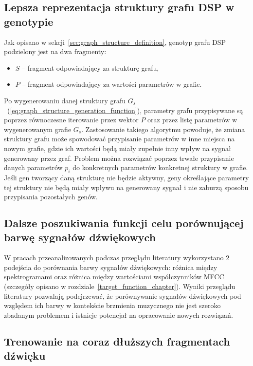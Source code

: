 \subsection{Lepsza reprezentacja struktury grafu DSP w genotypie}

Jak opisano w sekcji~\ref{sec:graph_structure_definition}, genotyp grafu DSP
podzielony jest na dwa fragmenty:

\begin{itemize}
  \item $S$ -- fragment odpowiadający za strukturę grafu,
  \item $P$ -- fragment odpowiadający za wartości parametrów w grafie.
\end{itemize}

Po wygenerowaniu danej struktury grafu $G_s$~(\ref{eq:graph_structure_generation_function}),
parametry grafu przypisywane są poprzez równoczesne iterowanie przez wektor $P$ oraz
przez listę parametrów w wygenerowanym grafie $G_s$. Zastosowanie takiego algorytmu
powoduje, że zmiana struktury grafu może spowodować przypisanie parametrów w inne miejsca
na nowym grafie, gdzie ich wartości będą miały zupełnie inny wpływ na sygnał
generowany przez graf. Problem można rozwiązać poprzez trwałe przypisanie danych
parametrów $p_i$ do konkretnych parametrów konkretnej struktury w grafie. Jeśli gen 
tworzący daną strukturę nie będzie aktywny, geny określające parametry tej struktury nie będą
miały wpływu na generowany sygnał i nie zaburzą sposobu przypisania pozostałych genów.


\subsection{Dalsze poszukiwania funkcji celu porównującej barwę sygnałów dźwiękowych}

W pracach przeanalizowanych podczas przeglądu literatury wykorzystano 2 podejścia
do porównania barwy sygnałów dźwiękowych: różnica między spektrogramami oraz
różnica między wartościami współczynników MFCC
(szczegóły opisano w rozdziale~\ref{target_function_chapter}).
Wyniki przeglądu literatury pozwalają podejrzewać, że porównywanie sygnałów
dźwiękowych pod względem ich barwy w kontekście brzmienia muzycznego
nie jest szeroko zbadanym problemem i istnieje potencjał na opracowanie
nowych rozwiązań.


\subsection{Trenowanie na coraz dłuższych fragmentach dźwięku}

